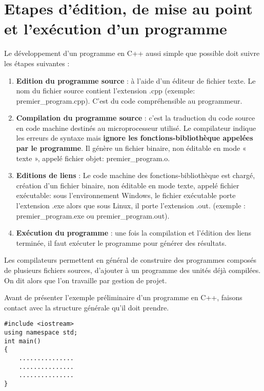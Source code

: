 \documentclass[a4paper, oneside,11pt]{book}
\begin{document}
\section{Etapes d'\'edition, de mise au point et l'ex\'ecution d'un programme}

Le d\'eveloppement d'un programme en C++ aussi simple que possible  doit suivre les \'etapes suivantes : 

\begin{enumerate}
\item \textbf{Edition du programme source} : \`a l'aide d'un \'editeur de fichier texte. Le nom du
fichier source contient l'extension .cpp (exemple: premier\_program.cpp). C'est du code compr\'ehensible au programmeur.
\item \textbf{Compilation du programme source} :  c'est la traduction du code source en code machine destin\'es au  microprocesseur utilis\'e. Le compilateur indique les 
erreurs de syntaxe mais \textbf{ignore les fonctions-biblioth\`eque appel\'ees par le programme}. Il g\'en\`ere un fichier binaire, non \'editable en mode « texte », appel\'e fichier objet:
 premier\_program.o.
\item \textbf{Editions de liens} : Le code machine des fonctions-biblioth\`eque est charg\'e, cr\'eation d'un fichier binaire, non \'editable en mode texte, appel\'e fichier ex\'ecutable:
 sous l'environnement Windows, le fichier ex\'ecutable porte l'extension .exe alors que sous Linux, il porte l'extension .out. (exemple : premier\_program.exe 
 ou premier\_program.out).
\item \textbf{Ex\'ecution du programme} : une fois la compilation et l'\'edition des liens termin\'ee, il faut ex\'ecuter le programme pour g\'en\'erer des r\'esultats.

\end{enumerate}


Les compilateurs permettent en g\'en\'eral de construire des programmes compos\'es de plusieurs
fichiers sources, d'ajouter \`a un programme des unit\'es d\'ej\`a compil\'ees. On dit alors que l'on
travaille par gestion de projet.

Avant de pr\'esenter l'exemple pr\'eliminaire d'un programme en C++, faisons contact avec la structure g\'en\'erale qu'il doit prendre.

\begin{lstlisting}
#include <iostream>
using namespace std;
int main()
{
    ...............
    ...............
    ...............
}
\end{lstlisting}
\end{document}
